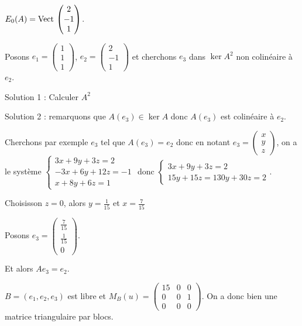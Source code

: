 \begin{exemple}
    $E_0(A) = \operatorname{Vect} \, \begin{pmatrix}
        2 \\ -1 \\ 1
    \end{pmatrix}$.

    Posons $e_1 = \begin{pmatrix}
        1 \\ 1 \\ 1
    \end{pmatrix}$, $e_2 = \begin{pmatrix}
        2 \\ -1 \\ 1
    \end{pmatrix}$ et cherchons $e_3$ dans $\ker A^2$ non colinéaire à $e_2$.

    \avspace Solution 1 : Calculer $A^2$ 

    \avspace Solution 2 : remarquons que $A(e_3) \in \ker A$ donc $A(e_3) $ est colinéaire à $e_2$.

    Cherchons par exemple $e_3$ tel que $A(e_3) = e_2$ donc en notant $e_3 = \begin{pmatrix}
        x \\ y \\ z
    \end{pmatrix}$, on a le système
    $\begin{cases}
        3x + 9y + 3z = 2 \\
        -3x + 6y + 12z = -1 \\
        x + 8y + 6z = 1
    \end{cases}$ donc $\begin{cases}
        3x + 9y + 3z = 2 \\
        15 y + 15 z = 1 
        30 y + 30 z = 2
    \end{cases}$. 
    
    Choisisson $z = 0$, alors $y = \frac{1}{15}$ et $x = \frac{7}{15}$

    Posons $e_3 = \begin{pmatrix}
        \frac{7}{15} \\ \frac{1}{15} \\ 0
    \end{pmatrix}$.

    Et alors $A e_3 = e_2$.

    $B = (e_1, e_2, e_3)$ est libre et $M_B(u) = \begin{pmatrix}
        15 & 0 & 0 \\
        0 & 0 & 1 \\
        0 & 0 & 0
    \end{pmatrix}$. On a donc bien une matrice triangulaire par blocs. 
\end{exemple}

